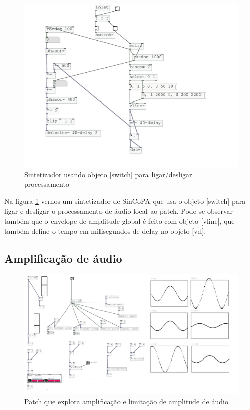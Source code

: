 \documentclass[draft]{ppgmus}
\begin{document}
\begin{figure}
\includegraphics[scale=.6]{switch}
\caption{Sintetizador usando objeto [switch\texttildelow] para ligar/desligar processamento}
\label{switch}
\end{figure}

Na figura \ref{switch} vemos um sintetizador de SinCoPA que usa o objeto [switch\texttildelow] para
ligar e desligar o processamento de áudio local ao patch. Pode-se observar também que o envelope
de amplitude global é feito com objeto [vline\texttildelow], que também define o tempo
em milisegundos de delay no objeto [vd\texttildelow].
 

\subsection{Amplificação de áudio}


\begin{figure}
\includegraphics[scale=.4]{limiter}
\caption{Patch que explora amplificação e limitação de amplitude de áudio}
\label{limiter}
\end{figure}
\end{document}
